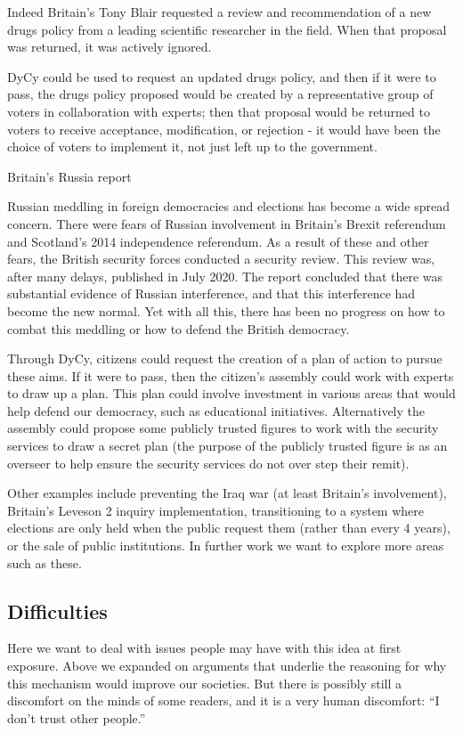\documentclass[twoside]{article}
\begin{document}
Indeed Britain's Tony Blair requested a review and recommendation of a new drugs policy from a leading scientific researcher in the field. When that proposal was returned, it was actively ignored.

DyCy could be used to request an updated drugs policy, and then if it were to pass, the drugs policy proposed would be created by a representative group of voters in collaboration with experts; then that proposal would be returned to voters to receive acceptance, modification, or rejection - it would have been the choice of voters to implement it, not just left up to the government.

Britain's Russia report

Russian meddling in foreign democracies and elections has become a wide spread concern. There were fears of Russian involvement in Britain's Brexit referendum and Scotland's 2014 independence referendum. As a result of these and other fears, the British security forces conducted a security review. This review was, after many delays, published in July 2020. The report concluded that there was substantial evidence of Russian interference, and that this interference had become the new normal. Yet with all this, there has been no progress on how to combat this meddling or how to defend the British democracy.

Through DyCy, citizens could request the creation of a plan of action to pursue these aims. If it were to pass, then the citizen's assembly could work with experts to draw up a plan. This plan could involve investment in various areas that would help defend our democracy, such as educational initiatives. Alternatively the assembly could propose some publicly trusted figures to work with the security services to draw a secret plan (the purpose of the publicly trusted figure is as an overseer to help ensure the security services do not over step their remit).

Other examples include preventing the Iraq war (at least Britain's involvement), Britain's Leveson 2 inquiry implementation, transitioning to a system where elections are only held when the public request them (rather than every 4 years), or the sale of public institutions. In further work we want to explore more areas such as these.

\subsection{Difficulties}

Here we want to deal with issues people may have with this idea at first exposure. Above we expanded on arguments that underlie the reasoning for why this mechanism would improve our societies. But there is possibly still a discomfort on the minds of some readers, and it is a very human discomfort: “I don’t trust other people.”
\end{document}
